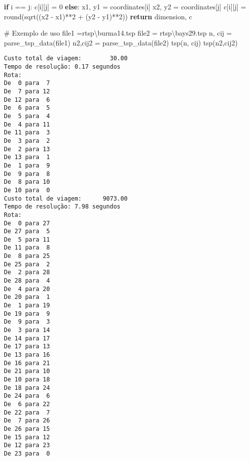 \documentclass[
  letterpaper,
  DIV=11,
  numbers=noendperiod]{scrartcl}
\newenvironment{Shaded}{\begin{snugshade}}{\end{snugshade}}
\newcommand{\BuiltInTok}[1]{\textcolor[rgb]{0.00,0.23,0.31}{#1}}
\newcommand{\CommentTok}[1]{\textcolor[rgb]{0.37,0.37,0.37}{#1}}
\newcommand{\ControlFlowTok}[1]{\textcolor[rgb]{0.00,0.23,0.31}{\textbf{#1}}}
\newcommand{\DecValTok}[1]{\textcolor[rgb]{0.68,0.00,0.00}{#1}}
\newcommand{\NormalTok}[1]{\textcolor[rgb]{0.00,0.23,0.31}{#1}}
\newcommand{\OperatorTok}[1]{\textcolor[rgb]{0.37,0.37,0.37}{#1}}
\newcommand{\VerbatimStringTok}[1]{\textcolor[rgb]{0.13,0.47,0.30}{#1}}
\begin{document}
\begin{Shaded}
\begin{Highlighting}[]
            \ControlFlowTok{if}\NormalTok{ i }\OperatorTok{==}\NormalTok{ j:}
\NormalTok{                c[i][j] }\OperatorTok{=} \DecValTok{0}
            \ControlFlowTok{else}\NormalTok{:}
\NormalTok{                x1, y1 }\OperatorTok{=}\NormalTok{ coordinates[i]}
\NormalTok{                x2, y2 }\OperatorTok{=}\NormalTok{ coordinates[j]}
\NormalTok{                c[i][j] }\OperatorTok{=} \BuiltInTok{round}\NormalTok{(sqrt((x2 }\OperatorTok{{-}}\NormalTok{ x1)}\OperatorTok{**}\DecValTok{2} \OperatorTok{+}\NormalTok{ (y2 }\OperatorTok{{-}}\NormalTok{ y1)}\OperatorTok{**}\DecValTok{2}\NormalTok{))}
    \ControlFlowTok{return}\NormalTok{ dimension, c}

\CommentTok{\# Exemplo de uso}
\NormalTok{file1 }\OperatorTok{=}\VerbatimStringTok{r\textquotesingle{}tsp\textbackslash{}burma14.tsp\textquotesingle{}}
\NormalTok{file2 }\OperatorTok{=} \VerbatimStringTok{r\textquotesingle{}tsp\textbackslash{}bays29.tsp\textquotesingle{}}
\NormalTok{n, cij }\OperatorTok{=}\NormalTok{ parse\_tsp\_data(file1)}
\NormalTok{n2,cij2 }\OperatorTok{=}\NormalTok{ parse\_tsp\_data(file2)}
\NormalTok{tsp(n, cij)}
\NormalTok{tsp(n2,cij2)}
\end{Highlighting}
\end{Shaded}

\begin{verbatim}
Custo total de viagem:        30.00
Tempo de resolução: 0.17 segundos
Rota:
De  0 para  7
De  7 para 12
De 12 para  6
De  6 para  5
De  5 para  4
De  4 para 11
De 11 para  3
De  3 para  2
De  2 para 13
De 13 para  1
De  1 para  9
De  9 para  8
De  8 para 10
De 10 para  0
Custo total de viagem:      9073.00
Tempo de resolução: 7.98 segundos
Rota:
De  0 para 27
De 27 para  5
De  5 para 11
De 11 para  8
De  8 para 25
De 25 para  2
De  2 para 28
De 28 para  4
De  4 para 20
De 20 para  1
De  1 para 19
De 19 para  9
De  9 para  3
De  3 para 14
De 14 para 17
De 17 para 13
De 13 para 16
De 16 para 21
De 21 para 10
De 10 para 18
De 18 para 24
De 24 para  6
De  6 para 22
De 22 para  7
De  7 para 26
De 26 para 15
De 15 para 12
De 12 para 23
De 23 para  0
\end{verbatim}
\end{document}
